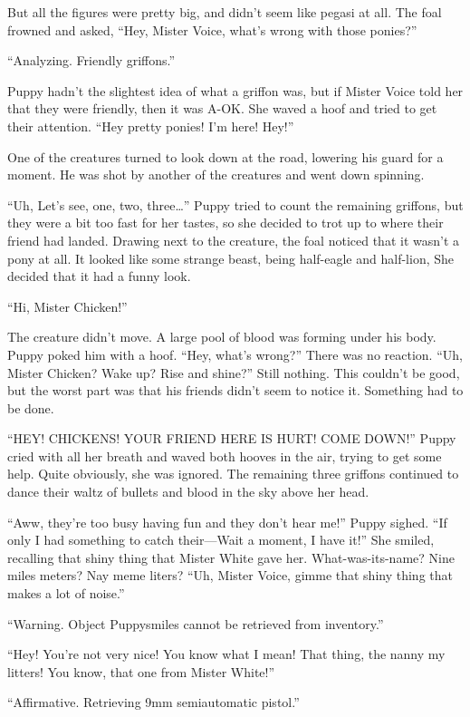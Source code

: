 But all the figures were pretty big, and didn't seem like pegasi at all. The foal frowned and asked, ``Hey, Mister Voice, what's wrong with those ponies?''

{\mten ``Analyzing. Friendly griffons.''}

Puppy hadn't the slightest idea of what a griffon was, but if Mister Voice told her that they were friendly, then it was A-OK. She waved a hoof and tried to get their attention. ``Hey pretty ponies! I'm here! Hey!''

One of the creatures turned to look down at the road, lowering his guard for a moment. He was shot by another of the creatures and went down spinning.

``Uh, Let's see, one, two, three\dots'' Puppy tried to count the remaining griffons, but they were a bit too fast for her tastes, so she decided to trot up to where their friend had landed. Drawing next to the creature, the foal noticed that it wasn't a pony at all. It looked like some strange beast, being half-eagle and half-lion, She decided that it had a funny look.

``Hi, Mister Chicken!''

The creature didn't move. A large pool of blood was forming under his body. Puppy poked him with a hoof. ``Hey, what's wrong?'' There was no reaction. ``Uh, Mister Chicken? Wake up? Rise and shine?'' Still nothing. This couldn't be good, but the worst part was that his friends didn't seem to notice it. Something had to be done.

``HEY! CHICKENS! YOUR FRIEND HERE IS HURT! COME DOWN!'' Puppy cried with all her breath and waved both hooves in the air, trying to get some help. Quite obviously, she was ignored. The remaining three griffons continued to dance their waltz of bullets and blood in the sky above her head.

``Aww, they're too busy having fun and they don't hear me!'' Puppy sighed. ``If only I had something to catch their---Wait a moment, I have it!'' She smiled, recalling that shiny thing that Mister White gave her. What-was-its-name? Nine miles meters? Nay meme liters? ``Uh, Mister Voice, gimme that shiny thing that makes a lot of noise.''

{\mten ``Warning. Object Puppysmiles cannot be retrieved from inventory.''}

``Hey! You're not very nice! You know what I mean! That thing, the nanny my litters! You know, that one from Mister White!''

{\mten ``Affirmative. Retrieving 9mm semiautomatic pistol.''}


